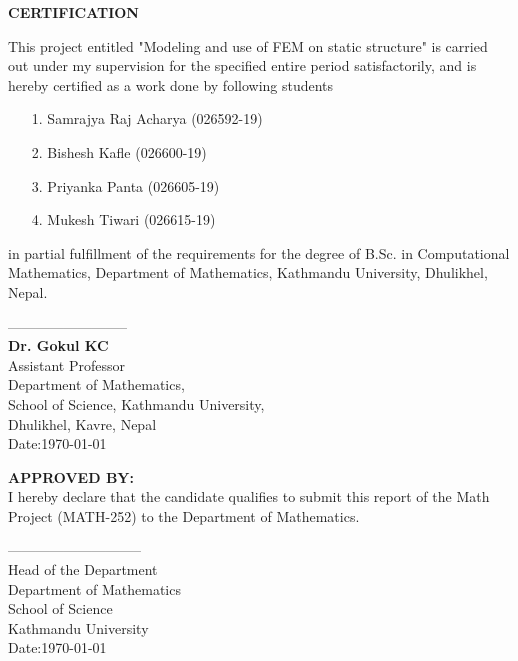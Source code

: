 



\begin{center}
	{\Large{\bf{ CERTIFICATION}}}
\end{center}


\noindent
This project entitled "Modeling and use of FEM on static structure" is carried out  under my supervision for the specified entire period satisfactorily, and is hereby certified as a work done by following students
\begin{itemize}
\item[1.] Samrajya Raj Acharya (026592-19)
\item[2.] Bishesh Kafle (026600-19)
\item[3.] Priyanka Panta (026605-19)
\item[4.] Mukesh Tiwari (026615-19)
\end{itemize}
 in partial fulfillment of the requirements for the degree of B.Sc. in Computational Mathematics, Department of Mathematics, Kathmandu University, Dhulikhel, Nepal.

\vspace{1.0cm}

\noindent
--------------------------\\
{\bf Dr. Gokul KC}\\
Assistant Professor \\
Department of Mathematics,\\
School of Science, Kathmandu University,\\
Dhulikhel, Kavre, Nepal\\
Date:\today

\vspace{1cm}

\noindent
{\bf APPROVED BY:}\\
I hereby declare that the candidate qualifies to submit this  report of the  Math Project (MATH-252) to the Department of Mathematics. 



\vspace{2cm}

\noindent
-----------------------------\\
Head of the Department\\
Department of Mathematics\\
School of Science\\
Kathmandu University\\
Date:\today
  
